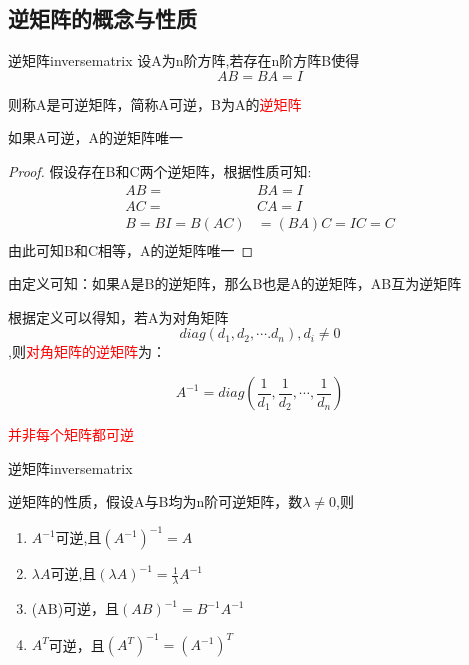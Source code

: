 \subsection{逆矩阵的概念与性质}
\begin{definition}{逆矩阵}{inversematrix}
	设A为n阶方阵,若存在n阶方阵B使得
	$$
		AB=BA=I
	$$

	则称A是可逆矩阵，简称A可逆，B为A的\textcolor{red}{逆矩阵}
\end{definition}

\begin{example}
	如果A可逆，A的逆矩阵唯一

	\begin{proof}
		假设存在B和C两个逆矩阵，根据性质可知:
		$$
			\begin{aligned}
				AB=        & BA=I        \\
				AC=        & CA=I        \\
				B=BI=B(AC) & =(BA)C=IC=C \\
			\end{aligned}
		$$
		由此可知B和C相等，A的逆矩阵唯一
	\end{proof}
\end{example}

由定义可知：如果A是B的逆矩阵，那么B也是A的逆矩阵，AB互为逆矩阵


根据定义可以得知，若A为对角矩阵
$$diag(d_1,d_2,\cdots.d_n),d_i\neq 0$$
,则\textcolor{red}{对角矩阵的逆矩阵}为：

$$
	A^{-1}=diag(\frac{1}{d_1},\frac{1}{d_2},\cdots,\frac{1}{d_n})
$$

\textcolor{red}{并非每个矩阵都可逆}

\begin{theorem}{逆矩阵}{inversematrix}

	逆矩阵的性质，假设A与B均为n阶可逆矩阵，数$\lambda\neq 0$,则

	\begin{enumerate}
		\item {$A^{-1}$可逆,且$(A^{-1})^{-1}=A$}
		\item $\lambda A$可逆,且$(\lambda A)^{-1}=\frac{1}{\lambda}A^{-1}$
		\item (AB)可逆，且$(AB)^{-1}=B^{-1}A^{-1}$
		\item $A^T$可逆，且$(A^T)^{-1}=(A^{-1})^T$
	\end{enumerate}
\end{theorem}

